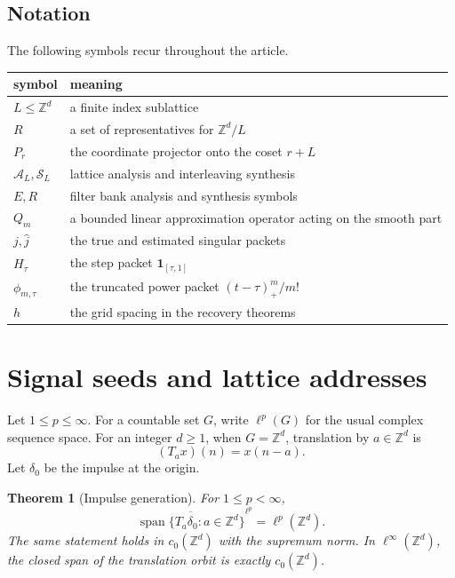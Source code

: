 \documentclass[11pt,letterpaper]{article}
\newtheorem{theorem}{Theorem}[section]
\theoremstyle{plain}
\theoremstyle{plain}
\theoremstyle{plain}
\theoremstyle{definition}
\theoremstyle{definition}
\theoremstyle{definition}
\theoremstyle{definition}
\theoremstyle{remark}
\theoremstyle{remark}
\theoremstyle{remark}
\theoremstyle{remark}
\newcommand{\ZZ}{\mathbb Z}
\newcommand{\Acal}{\mathcal A}
\newcommand{\Scal}{\mathcal S}
\newcommand{\one}{\mathbf 1}
\newcommand{\Span}{\operatorname{span}}
\let\KomorebiPrimitiveWidehat\widehat
\renewcommand{\widehat}[1]{\KomorebiPrimitiveWidehat{#1}}
\begin{document}
\subsection{Notation}

The following symbols recur throughout the article.
\begin{center}
\begin{tabular}{p{}p{}}
\toprule
symbol & meaning\\
\midrule
\(L\leq\ZZ^d\) & a finite index sublattice\\
\(R\) & a set of representatives for \(\ZZ^d/L\)\\
\(P_r\) & the coordinate projector onto the coset \(r+L\)\\
\(\Acal_L,\Scal_L\) & lattice analysis and interleaving synthesis\\
\(E,R\) & filter bank analysis and synthesis symbols\\
\(Q_m\) & a bounded linear approximation operator acting on the smooth part\\
\(j,\widehat j\) & the true and estimated singular packets\\
\(H_\tau\) & the step packet \(\one_{[\tau,1]}\)\\
\(\phi_{m,\tau}\) & the truncated power packet \((t-\tau)_+^m/m!\)\\
\(h\) & the grid spacing in the recovery theorems\\
\bottomrule
\end{tabular}
\end{center}

\section{Signal seeds and lattice addresses}\label{extension:section:02}\label{sec:signal_seeds}

Let \(1\leq p\leq\infty\). For a countable set \(G\), write \(\ell^p(G)\) for the usual complex sequence space. For an integer \(d\geq1\), when \(G=\ZZ^d\), translation by \(a\in\ZZ^d\) is
\[
(T_ax)(n)=x(n-a).
\]
Let \(\delta_0\) be the impulse at the origin.

\begin{theorem}[Impulse generation]\label{thm:impulse_generation}
For \(1\leq p<\infty\),
\[
\overline{\Span\{T_a\delta_0:a\in\ZZ^d\}}^{\ell^p}
=
\ell^p(\ZZ^d).
\]
The same statement holds in \(c_0(\ZZ^d)\) with the supremum norm. In \(\ell^\infty(\ZZ^d)\), the closed span of the translation orbit is exactly \(c_0(\ZZ^d)\).
\end{theorem}
\end{document}
